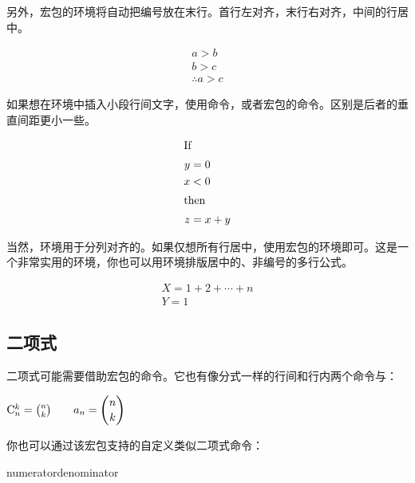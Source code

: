 另外，宏包的环境将自动把编号放在末行。首行左对齐，末行右对齐，中间的行居中。
\begin{codeshow}
\begin{multline}
a>b \\
b>c \\
\therefore a>c
\end{multline}
\end{codeshow}

如果想在环境中插入小段行间文字，使用命令，或者宏包的命令。区别是后者的垂直间距更小一些。

\begin{codeshow}
\begin{align*}
\shortintertext{If}
 y &= 0 \\
 x &< 0\\
\shortintertext{then}
 z &= x+y
\end{align*}
\end{codeshow}

当然，环境用于分列对齐的。如果仅想所有行居中，使用宏包的环境即可。这是一个非常实用的环境，你也可以用环境排版居中的、非编号的多行公式。

\begin{codeshow}
\begin{gather}
  X=1+2+\cdots+n \\
  Y=1
\end{gather}
\end{codeshow}

\subsection{二项式}
\label{subsec:binom}
二项式可能需要借助宏包的命令。它也有像分式一样的行间和行内两个命令与：

\begin{codeshow}
$\mathrm{C}_n^k=\binom{n}{k}
\qquad a_n=\dbinom{n}{k}$
\end{codeshow}

你也可以通过该宏包支持的自定义类似二项式命令：
\begin{latex}
{numerator}{denominator}
\newcommand{\Bfrac}[2]{\genfrac{[}{]}{0pt}{}{#1}{#2}}
\end{latex}

